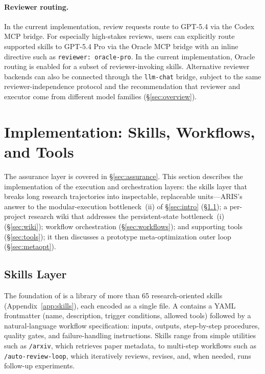 \paragraph{Reviewer routing.}
In the current implementation, review requests route to GPT-5.4 via the Codex MCP bridge.
For especially high-stakes reviews, users can explicitly route supported skills to GPT-5.4 Pro via the Oracle MCP bridge with an inline directive such as \texttt{reviewer: oracle-pro}.
In the current implementation, Oracle routing is enabled for a subset of reviewer-invoking skills.
Alternative reviewer backends can also be connected through the \texttt{llm-chat} bridge, subject to the same reviewer-independence protocol and the recommendation that reviewer and executor come from different model families (\S\ref{sec:overview}).

\section{Implementation: Skills, Workflows, and Tools}
\label{sec:realization}

The assurance layer is covered in \S\ref{sec:assurance}.
This section describes the implementation of the execution and orchestration layers: the skills layer that breaks long research trajectories into inspectable, replaceable units---ARIS's answer to the modular-execution bottleneck~(ii) of \S\ref{sec:intro} (\S\ref{sec:skills}); a per-project research wiki that addresses the persistent-state bottleneck~(i) (\S\ref{sec:wiki}); workflow orchestration (\S\ref{sec:workflows}); and supporting tools (\S\ref{sec:tools}); it then discusses a prototype meta-optimization outer loop (\S\ref{sec:metaopt}).

\subsection{Skills Layer}
\label{sec:skills}

The foundation of \aris{} is a library of more than 65 research-oriented skills (Appendix~\ref{app:skills}), each encoded as a single \skillmd{} file.
A \skillmd{} contains a YAML frontmatter (name, description, trigger conditions, allowed tools) followed by a natural-language workflow specification: inputs, outputs, step-by-step procedures, quality gates, and failure-handling instructions.
Skills range from simple utilities such as \texttt{/arxiv}, which retrieves paper metadata, to multi-step workflows such as \texttt{/auto-review-loop}, which iteratively reviews, revises, and, when needed, runs follow-up experiments.

